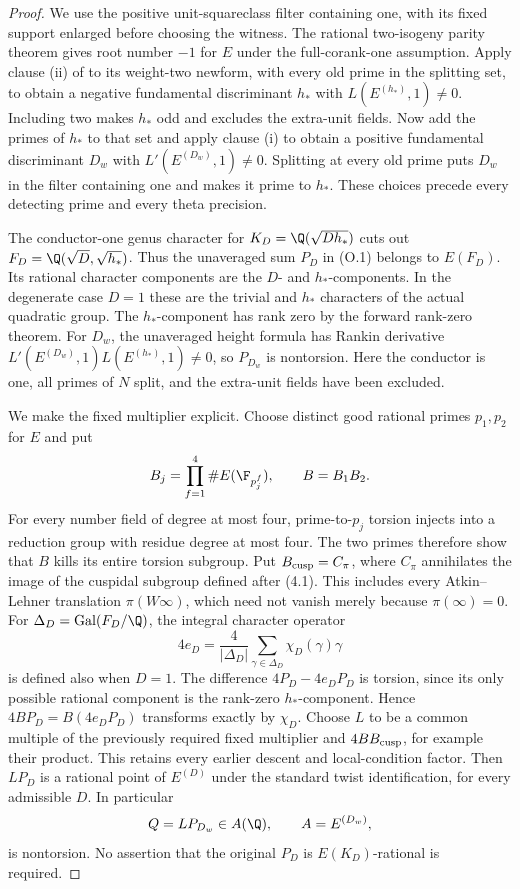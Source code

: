 \begin{proof}\leavevmode
We use the positive unit-squareclass filter containing one, with its
fixed support enlarged before choosing the witness. The rational
two-isogeny parity theorem \cite[Theorem 1.8]{dd} gives root number
$-1$ for $E$ under the full-corank-one assumption. Apply clause (ii)
of \cite[pp.~543--544]{bfh} to its weight-two newform, with every
old prime in the splitting set, to obtain a negative fundamental
discriminant $h_*$ with $L(E^{(h_*)},1)\ne0$. Including two makes
$h_*$ odd and excludes the extra-unit fields. Now add the primes
of $h_*$ to that set and apply clause (i) to obtain a positive
fundamental discriminant $D_w$ with $L'(E^{(D_w)},1)\ne0$.
Splitting at every old prime puts $D_w$ in the filter containing one
and makes it prime to $h_*$. These choices precede every detecting
prime and every theta precision.

The conductor-one genus character for
$K_D=\Q(\sqrt{Dh_*})$ cuts out
$F_D=\Q(\sqrt D,\sqrt{h_*})$. Thus the unaveraged sum $P_D$ in (O.1)
belongs to $E(F_D)$. Its rational character components are the
$D$- and $h_*$-components. In the degenerate case $D=1$ these are
the trivial and $h_*$ characters of the actual quadratic group.
The $h_*$-component has rank zero by the forward rank-zero theorem.
For $D_w$, the unaveraged height formula
\cite[Theorem 1.1]{cst} has Rankin derivative
$L'(E^{(D_w)},1)L(E^{(h_*)},1)\ne0$, so $P_{D_w}$ is nontorsion.
Here the conductor is one, all primes of $N$ split, and the
extra-unit fields have been excluded.

We make the fixed multiplier explicit. Choose distinct good rational
primes $p_1,p_2$ for $E$ and put
\[
 B_j=\prod_{f=1}^{4}\#E(\F_{p_j^f}),\qquad B=B_1B_2.
\]
For every number field of degree at most four, prime-to-$p_j$
torsion injects into a reduction group with residue degree at most
four. The two primes therefore show that $B$ kills its entire
torsion subgroup. Put $B_{\rm cusp}=C_\pi$, where $C_\pi$
annihilates the image of the cuspidal subgroup defined after (4.1).
This includes every Atkin--Lehner translation $\pi(W\infty)$,
which need not vanish merely because $\pi(\infty)=0$. For $\Delta_D=\operatorname{Gal}(F_D/\Q)$,
the integral character operator
\[
 4e_D=\frac4{|\Delta_D|}
                  \sum_{\gamma\in\Delta_D}\chi_D(\gamma)\gamma
\]
is defined also when $D=1$. The difference
$4P_D-4e_DP_D$ is torsion, since its only possible rational
component is the rank-zero $h_*$-component. Hence
$4BP_D=B(4e_DP_D)$ transforms exactly by $\chi_D$.
Choose $L$ to be a common multiple of the previously required fixed
multiplier and $4BB_{\rm cusp}$, for example their product. This
retains every earlier descent and local-condition factor.
Then $LP_D$ is a rational point of
$E^{(D)}$ under the standard twist identification, for every
admissible $D$. In particular
\[
                         Q=LP_{D_w}\in A(\Q),
                 \qquad A=E^{(D_w)},
\]
is nontorsion. No assertion that the original $P_D$ is
$E(K_D)$-rational is required.


\end{proof}
